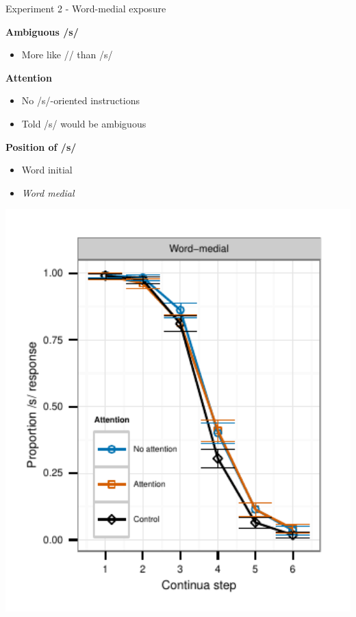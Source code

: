 \documentclass{beamer}
\begin{document}
\begin{frame}{Experiment 2 - Word-medial exposure}

\begin{minipage}{0.4\textwidth}
\textbf{Ambiguous /s/}
\begin{itemize}
\item More like /\textesh/ than /s/
\end{itemize}

\textbf{Attention}
\begin{itemize}
\item No /s/-oriented instructions
\item Told /s/ would be ambiguous
\end{itemize}

\textbf{Position of /s/}
\begin{itemize}
\item Word initial
\item \emph{Word medial}
\end{itemize}
\end{minipage}
\hfill
\begin{minipage}{0.53\textwidth}
\includegraphics[width=1.0\textwidth]{graphs/exp2_categresults_present2-final}
\end{minipage}

\end{frame}
\end{document}
